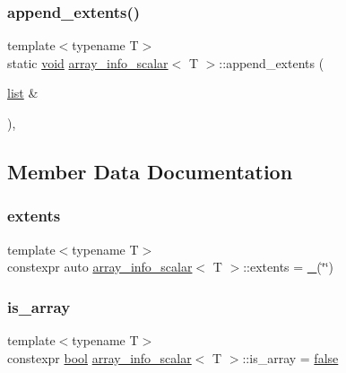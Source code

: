 \subsubsection{\texorpdfstring{append\_extents()}{append\_extents()}}
{\footnotesize\ttfamily template$<$typename T$>$ \\
static \mbox{\hyperlink{_s_d_l__opengles2__gl2ext_8h_ae5d8fa23ad07c48bb609509eae494c95}{void}} \mbox{\hyperlink{structarray__info__scalar}{array\+\_\+info\+\_\+scalar}}$<$ T $>$\+::append\+\_\+extents (\begin{DoxyParamCaption}\item[{\mbox{\hyperlink{classlist}{list}} \&}]{ }\end{DoxyParamCaption})\hspace{0.3cm}{\ttfamily [inline]}, {\ttfamily [static]}}



\subsection{Member Data Documentation}
\mbox{\label{structarray__info__scalar_a8908646f2c1f7331a8fac332c5fb1cd6}} 
\subsubsection{\texorpdfstring{extents}{extents}}
{\footnotesize\ttfamily template$<$typename T$>$ \\
constexpr auto \mbox{\hyperlink{structarray__info__scalar}{array\+\_\+info\+\_\+scalar}}$<$ T $>$\+::extents = \mbox{\hyperlink{descr_8h_af114703e20c6527e87163eb2798f74b8}{\+\_\+}}(\char`\"{}\char`\"{})\hspace{0.3cm}{\ttfamily [static]}}

\mbox{\label{structarray__info__scalar_a47f7961dd80e4ade11cd580835b12083}} 
\subsubsection{\texorpdfstring{is\_array}{is\_array}}
{\footnotesize\ttfamily template$<$typename T$>$ \\
constexpr \mbox{\hyperlink{asdl_8h_af6a258d8f3ee5206d682d799316314b1}{bool}} \mbox{\hyperlink{structarray__info__scalar}{array\+\_\+info\+\_\+scalar}}$<$ T $>$\+::is\+\_\+array = \mbox{\hyperlink{asdl_8h_af6a258d8f3ee5206d682d799316314b1ae9de385ef6fe9bf3360d1038396b884c}{false}}\hspace{0.3cm}{\ttfamily [static]}}

